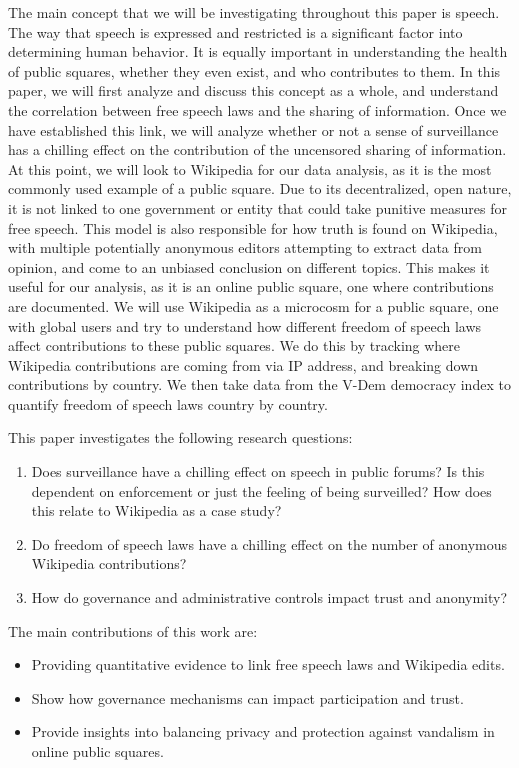 
The main concept that we will be investigating throughout this paper is speech. The way that speech is expressed and restricted is a significant factor into determining human behavior. It is equally important in understanding the health of public squares, whether they even exist, and who contributes to them. In this paper, we will first analyze and discuss this concept as a whole, and understand the correlation between free speech laws and the sharing of information. Once we have established this link, we will analyze whether or not a sense of surveillance has a chilling effect on the contribution of the uncensored sharing of information. At this point, we will look to Wikipedia for our data analysis, as it is the most commonly used example of a public square. Due to its decentralized, open nature, it is not linked to one government or entity that could take punitive measures for free speech. This model is also responsible for how truth is found on Wikipedia, with multiple potentially anonymous editors attempting to extract data from opinion, and come to an unbiased conclusion on different topics. This makes it useful for our analysis, as it is an online public square, one where contributions are documented. We will use Wikipedia as a microcosm for a public square, one with global users and try to understand how different freedom of speech laws affect contributions to these public squares. We do this by tracking where Wikipedia contributions are coming from via IP address, and breaking down contributions by country. We then take data from the V-Dem democracy index to quantify freedom of speech laws country by country. 

This paper investigates the following research questions:
\begin{enumerate}
    \item Does surveillance have a chilling effect on speech in public forums? Is this dependent on enforcement or just the feeling of being surveilled? How does this relate to Wikipedia as a case study?
    \item Do freedom of speech laws have a chilling effect on the number of anonymous Wikipedia contributions?
    \item How do governance and administrative controls impact trust and anonymity?
\end{enumerate}

The main contributions of this work are:
\begin{itemize}
    \item Providing quantitative evidence to link free speech laws and Wikipedia edits.
    \item Show how governance mechanisms can impact participation and trust.
    \item Provide insights into balancing privacy and protection against vandalism in online public squares.
\end{itemize}

